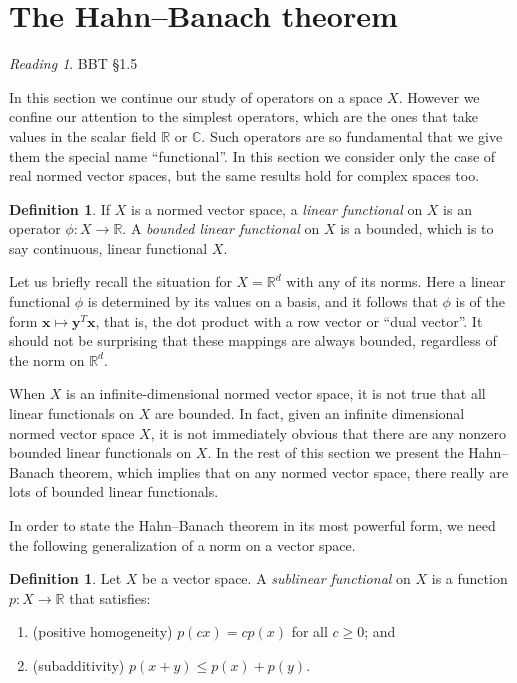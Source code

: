 \documentclass[11pt,oneside]{amsbook}
\newcommand{\RR}{{\mathbb R}}
\newcommand{\CC}{{\mathbb C}}
\theoremstyle{definition}
\theoremstyle{plain}
\theoremstyle{definition}
\newtheorem{defn}[thm]{Definition}
\theoremstyle{remark}
\newtheorem*{reading}{Reading}
\numberwithin{equation}{section}
\numberwithin{figure}{section}
\begin{document}
\newpage
\section{The Hahn--Banach theorem}

\begin{reading}
  BBT \S 1.5
\end{reading}

In this section we continue our study of operators on a space $X$. However we confine our attention to the simplest operators, which are the ones that take values in the scalar field $\RR$ or $\CC$. Such operators are so fundamental that we give them the special name ``functional''. In this section we consider only the case of real normed vector spaces, but the same results hold for complex spaces too.

\begin{defn}
  If $X$ is a normed vector space, a \emph{linear functional} on $X$ is an operator $\phi\colon X\to\RR$. A \emph{bounded linear functional} on $X$ is a bounded, which is to say continuous, linear functional $X$.
\end{defn}

Let us briefly recall the situation for $X=\RR^d$ with any of its norms. Here a linear functional $\phi$ is determined by its values on a basis, and it follows that $\phi$ is of the form $\mathbf{x}\mapsto\mathbf{y}^T\mathbf{x}$, that is, the dot product with a row vector or ``dual vector''. It should not be surprising that these mappings are always bounded, regardless of the norm on $\RR^d$.

When $X$ is an infinite-dimensional normed vector space, it is not true that all linear functionals on $X$ are bounded. In fact, given an infinite dimensional normed vector space $X$, it is not immediately obvious that there are any nonzero bounded linear functionals on $X$. In the rest of this section we present the Hahn--Banach theorem, which implies that on any normed vector space, there really are lots of bounded linear functionals.

In order to state the Hahn--Banach theorem in its most powerful form, we need the following generalization of a norm on a vector space.

\begin{defn}
  Let $X$ be a vector space. A \emph{sublinear functional} on $X$ is a function $p\colon X\to\RR$ that satisfies:
  \begin{enumerate}
  \item (positive homogeneity) $p(cx)=cp(x)$ for all $c\geq0$; and
  \item (subadditivity) $p(x+y)\leq p(x)+p(y)$.
  \end{enumerate}
\end{defn}
\end{document}
